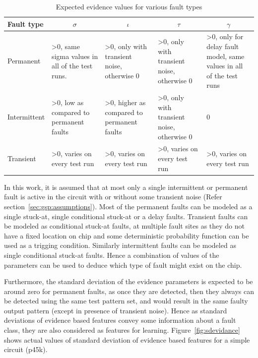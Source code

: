 \begin{table}[h]
\captionsetup{justification=centering}

\begin{tabular}{p{2cm}p{2.5cm}p{2.5cm}p{2.5cm}p{2.5cm}}
\hline
Fault type   & \multicolumn{1}{c}{$\sigma$}                              & \multicolumn{1}{c}{$\iota$}                           & \multicolumn{1}{c}{$\tau$}                            & \multicolumn{1}{c}{$\gamma$}                                                   \\ \hline
Permanent    & \textgreater0, same sigma values in all of the test runs. & \textgreater0, only with transient noise, otherwise 0 & \textgreater0, only with transient noise, otherwise 0 & \textgreater0, only for delay fault model, same values in all of the test runs \\
Intermittent & \textgreater0, low as compared to permanent faults        & \textgreater0, higher as compared to permanent faults & \textgreater0, only with transient noise, otherwise 0 & 0                                                                              \\
Transient    & \textgreater0, varies on every test run                     & \textgreater0, varies on every test run                 & \textgreater0, varies on every test run                 & \textgreater0, varies on every test run                                         \\
\hline
\end{tabular}

\caption{Expected evidence values for various fault types}
\label{tab:diagparam}
\end{table}


In this work, it is assumed that at most only a single intermittent or permanent fault is active in the circuit with or without some transient noise (Refer section~\ref{sec:gsp:assumptions}). Most of the permanent faults can be modeled as a single stuck-at, single conditional stuck-at or a delay faults. Transient faults can be modeled as conditional stuck-at faults, at multiple fault sites as they do not have a fixed location on chip and some deterministic probability function can be used as a trigging condition. Similarly intermittent faults can be modeled as single conditional stuck-at faults. Hence a combination of values of the parameters can be used to deduce which type of fault might exist on the chip.

Furthermore, the standard deviation of the evidence parameters is expected to be around zero for permanent faults, as once they are detected, then they always can be detected using the same test pattern set, and would result in the same faulty output pattern (except in presence of transient noise). Hence as standard deviations of evidence based features convey some information about a fault class, they are also considered as features for learning. Figure~\ref{fig:sdevidance} shows actual values of standard deviation of evidence based features for a simple circuit (p45k).

